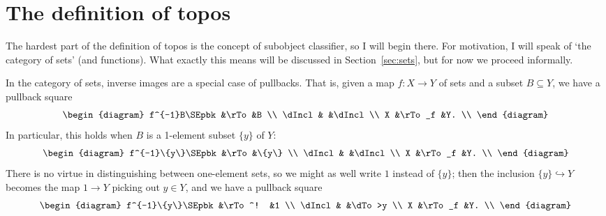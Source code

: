 \documentclass{article}
\newcommand{\sub}{\subseteq}
\newcommand{\incl}{\hookrightarrow}
\newcommand{\cln}{\colon}
\begin{document}
\section{The definition of topos}
\label{sec:defn}



The hardest part of the definition of topos is the concept of subobject
classifier, so I will begin there.  For motivation, I will speak of `the
category of sets' (and functions).  What exactly this means will be discussed
in Section~\ref{sec:sets}, but for now we proceed informally.

In the category of sets, inverse images are a special case of pullbacks.
That is, given a map $f\cln X \to Y$ of sets and a subset $B \sub Y$, we have a
pullback square
\[
\begin{diagram}
f^{-1}B\SEpbk   &\rTo   &B      \\
\dIncl          &       &\dIncl \\
X               &\rTo_f &Y.     \\
\end{diagram}
\]
In particular, this holds when $B$ is a 1-element subset $\{y\}$ of $Y$:
\[
\begin{diagram}
f^{-1}\{y\}\SEpbk         &\rTo   &\{y\}  \\
\dIncl                  &       &\dIncl \\
X                       &\rTo_f &Y.     \\
\end{diagram}
\]
There is no virtue in distinguishing between one-element sets, so we might as
well write $1$ instead of $\{y\}$; then the inclusion $\{y\} \incl Y$ becomes
the map $1 \to Y$ picking out $y \in Y$, and we have a pullback square
\[
\begin{diagram}
f^{-1}\{y\}\SEpbk       &\rTo^! &1      \\
\dIncl                  &       &\dTo>y \\
X                       &\rTo_f &Y.     \\
\end{diagram}
\]
\end{document}
